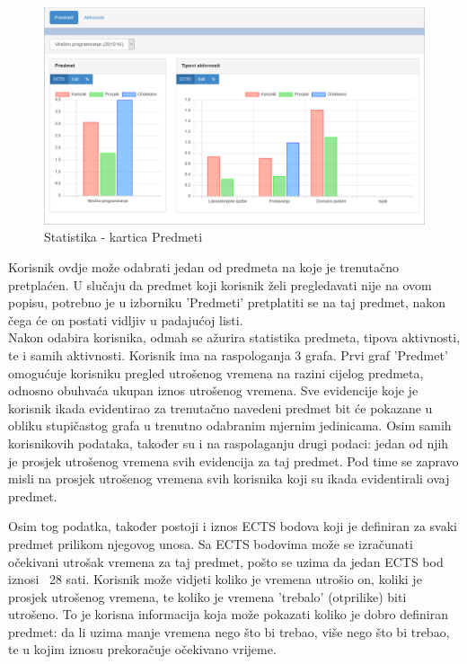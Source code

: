 \documentclass[times, utf8, zavrsni]{fer}
\begin{document}
\begin{figure}[H]
\centering
\includegraphics[width=\textwidth,height=\textheight,keepaspectratio]{img/statistika-web.png}
\caption{Statistika - kartica Predmeti}
\label{fig:statistika-web}
\end{figure}

Korisnik ovdje može odabrati jedan od predmeta na koje je trenutačno pretplaćen. U slučaju da predmet koji korisnik želi pregledavati nije na ovom popisu, potrebno je u izborniku 'Predmeti' pretplatiti se na taj predmet, nakon čega će on postati vidljiv u padajućoj listi.\\

Nakon odabira korisnika, odmah se ažurira statistika predmeta, tipova aktivnosti, te i samih aktivnosti. Korisnik ima na raspologanja 3 grafa. Prvi graf 'Predmet' omogućuje korisniku pregled utrošenog vremena na razini cijelog predmeta, odnosno obuhvaća ukupan iznos utrošenog vremena. Sve evidencije koje je korisnik ikada evidentirao za trenutačno navedeni predmet bit će pokazane u obliku stupičastog grafa u trenutno odabranim mjernim jedinicama. Osim samih korisnikovih podataka, također su i na raspolaganju drugi podaci: jedan od njih je prosjek utrošenog vremena svih evidencija za taj predmet. Pod time se zapravo misli na prosjek utrošenog vremena svih korisnika koji su ikada evidentirali ovaj predmet.

Osim tog podatka, također postoji i iznos ECTS bodova koji je definiran za svaki predmet prilikom njegovog unosa. Sa ECTS bodovima može se izračunati očekivani utrošak vremena za taj predmet, pošto se uzima da jedan ECTS bod iznosi ~28 sati. Korisnik može vidjeti koliko je vremena utrošio on, koliki je prosjek utrošenog vremena, te koliko je vremena 'trebalo' (otprilike) biti utrošeno. To je korisna informacija koja može pokazati koliko je dobro definiran predmet: da li uzima manje vremena nego što bi trebao, više nego što bi trebao, te u kojim iznosu prekoračuje očekivano vrijeme.
\end{document}
